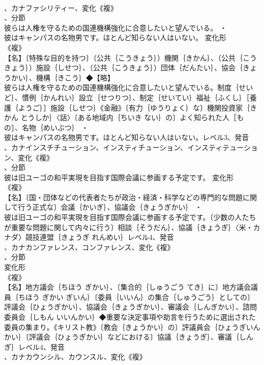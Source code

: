 \documentclass[8pt]{extreport}
\begin{document}
\begin{CJK}{UTF8}{min}
\\	、カナファシリティー、変化《複》
\\	、分節
\\	彼らは人権を守るための国連機構強化に合意したいと望んでいる。 ・
\\	彼はキャンパスの名物男です。ほとんど知らない人はいない。	変化形 
\\	《複》
\\	【名】〔特殊な目的を持つ〕（公共｛こうきょう｝）機関｛きかん｝、（公共｛こうきょう｝）施設｛しせつ｝、（公共｛こうきょう｝）団体｛だんたい｝、協会｛きょうかい｝、機構｛きこう｝◆【略】
\\	彼らは人権を守るための国連機構強化に合意したいと望んでいる。制度｛せいど｝、慣例｛かんれい｝設立｛せつりつ｝、制定｛せいてい｝福祉｛ふくし｝［養護｛ようご｝］施設｛しせつ｝《金融》〔有力｛ゆうりょく｝な〕機関投資家｛きかん とうしか｝〈話〉〔ある地域内｛ちいき ない｝の〕よく知られた人［もの］、名物｛めいぶつ｝ ・
\\	彼はキャンパスの名物男です。ほとんど知らない人はいない。レベル3、発音
\\	、カナインスチチューション、インスティチューション、インスティテューション、変化《複》
\\	、分節
\\	彼は旧ユーゴの和平実現を目指す国際会議に参画する予定です。	変化形 
\\	《複》
\\	【名】〔国・団体などの代表者たちが政治・経済・科学などの専門的な問題に関して行う正式な〕会議｛かいぎ｝、協議会｛きょうぎかい｝ ・
\\	彼は旧ユーゴの和平実現を目指す国際会議に参画する予定です。〔少数の人たちが重要な問題に関して内々に行う〕相談｛そうだん｝、協議｛きょうぎ｝〈米・カナダ〉競技連盟｛きょうぎ れんめい｝レベル4、発音
\\	、カナカンファレンス、コンファレンス、変化《複》
\\	、分節
\\	変化形 
\\	《複》
\\	【名】地方議会｛ちほう ぎかい｝、〔集合的｛しゅうごう てき｝に〕地方議会議員｛ちほう ぎかい ぎいん｝〔委員｛いいん｝の集合｛しゅうごう｝としての〕評議会｛ひょうぎかい｝、協議会｛きょうぎかい｝、審議会｛しんぎかい｝、諮問委員会｛しもん いいんかい｝◆重要な決定事項や助言を行うために選出された委員の集まり。《キリスト教》〔教会｛きょうかい｝の〕評議員会｛ひょうぎいん かい｝〔評議会｛ひょうぎかい｝などにおける〕協議｛きょうぎ｝、審議｛しんぎ｝レベル4、発音
\\	、カナカウンシル、カウンスル、変化《複》

\end{CJK}
\end{document}
